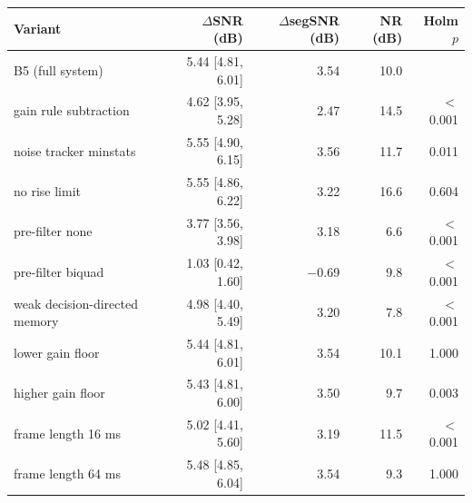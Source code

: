 \begin{tabular}{lrrrr}
\toprule
Variant & $\Delta$SNR (dB) & $\Delta$segSNR (dB) & NR (dB) & Holm $p$ \\
\midrule
B5 (full system) & 5.44 [4.81, 6.01] & 3.54 & 10.0 &  \\
gain rule subtraction & 4.62 [3.95, 5.28] & 2.47 & 14.5 & $<$0.001 \\
noise tracker minstats & 5.55 [4.90, 6.15] & 3.56 & 11.7 & 0.011 \\
no rise limit & 5.55 [4.86, 6.22] & 3.22 & 16.6 & 0.604 \\
pre-filter none & 3.77 [3.56, 3.98] & 3.18 & 6.6 & $<$0.001 \\
pre-filter biquad & 1.03 [0.42, 1.60] & $-$0.69 & 9.8 & $<$0.001 \\
weak decision-directed memory & 4.98 [4.40, 5.49] & 3.20 & 7.8 & $<$0.001 \\
lower gain floor & 5.44 [4.81, 6.01] & 3.54 & 10.1 & 1.000 \\
higher gain floor & 5.43 [4.81, 6.00] & 3.50 & 9.7 & 0.003 \\
frame length 16 ms & 5.02 [4.41, 5.60] & 3.19 & 11.5 & $<$0.001 \\
frame length 64 ms & 5.48 [4.85, 6.04] & 3.54 & 9.3 & 1.000 \\
\bottomrule
\end{tabular}
